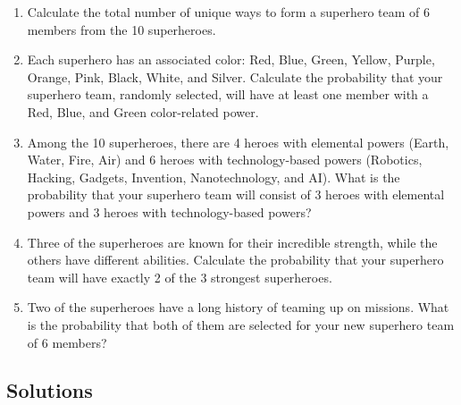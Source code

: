\documentclass[a4paper, 10pt]{article}
\begin{document}
            \begin{enumerate}[label=(\alph*)]
                \item Calculate the total number of unique ways to form a superhero team of 6 members from the 10 superheroes.
                \item Each superhero has an associated color: Red, Blue, Green, Yellow, Purple, Orange, Pink, Black, White, and Silver. Calculate the probability that your superhero team, randomly selected, will have at least one member with a Red, Blue, and Green color-related power.
                \item Among the 10 superheroes, there are 4 heroes with elemental powers (Earth, Water, Fire, Air) and 6 heroes with technology-based powers (Robotics, Hacking, Gadgets, Invention, Nanotechnology, and AI). What is the probability that your superhero team will consist of 3 heroes with elemental powers and 3 heroes with technology-based powers?
                \item Three of the superheroes are known for their incredible strength, while the others have different abilities. Calculate the probability that your superhero team will have exactly 2 of the 3 strongest superheroes.
                \item Two of the superheroes have a long history of teaming up on missions. What is the probability that both of them are selected for your new superhero team of 6 members?
            \end{enumerate}

        \subsection{Solutions}
\end{document}

